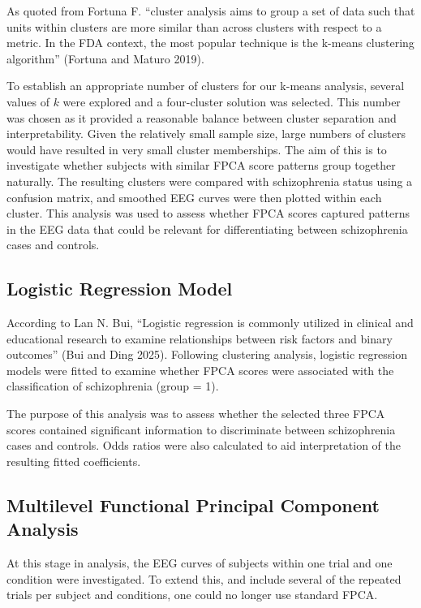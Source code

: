 \documentclass{article}
\begin{document}
As quoted from Fortuna F. ``cluster analysis aims to group a set of data
such that units within clusters are more similar than across clusters
with respect to a metric. In the FDA context, the most popular technique
is the k-means clustering algorithm'' (Fortuna and Maturo 2019).

To establish an appropriate number of clusters for our k-means analysis,
several values of \(k\) were explored and a four-cluster solution was
selected. This number was chosen as it provided a reasonable balance
between cluster separation and interpretability. Given the relatively
small sample size, large numbers of clusters would have resulted in very
small cluster memberships. The aim of this is to investigate whether
subjects with similar FPCA score patterns group together naturally. The
resulting clusters were compared with schizophrenia status using a
confusion matrix, and smoothed EEG curves were then plotted within each
cluster. This analysis was used to assess whether FPCA scores captured
patterns in the EEG data that could be relevant for differentiating
between schizophrenia cases and controls.

\subsection{Logistic Regression Model}\label{logistic-regression-model}

According to Lan N. Bui, ``Logistic regression is commonly utilized in
clinical and educational research to examine relationships between risk
factors and binary outcomes'' (Bui and Ding 2025). Following clustering
analysis, logistic regression models were fitted to examine whether FPCA
scores were associated with the classification of schizophrenia (group =
1).

The purpose of this analysis was to assess whether the selected three
FPCA scores contained significant information to discriminate between
schizophrenia cases and controls. Odds ratios were also calculated to
aid interpretation of the resulting fitted coefficients.

\subsection{Multilevel Functional Principal Component
Analysis}\label{multilevel-functional-principal-component-analysis}

At this stage in analysis, the EEG curves of subjects within one trial
and one condition were investigated. To extend this, and include several
of the repeated trials per subject and conditions, one could no longer
use standard FPCA.
\end{document}
